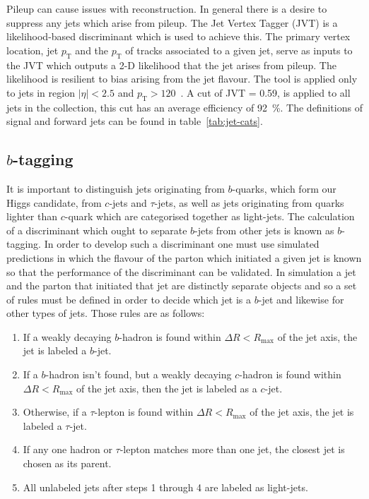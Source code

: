 Pileup can cause issues with reconstruction. In general there is a desire to
suppress any jets which arise from pileup. The Jet Vertex Tagger (JVT) is a
likelihood-based discriminant which is used to achieve this. The primary vertex
location, jet $p_{\mathrm{T}}$ and the $p_{\mathrm{T}}$ of tracks associated to
a given jet, serve as inputs to the JVT which outputs a 2-D likelihood that the
jet arises from pileup. The likelihood is resilient to bias arising from the jet
flavour. The tool is applied only to jets in region $\lvert \eta \rvert < 2.5$
and $p_{\mathrm{T}} > 120$~\GeV. A cut of JVT = 0.59, is applied to all jets in
the collection, this cut has an average efficiency of 92~\%. The definitions of
signal and forward jets can be found in table~\ref{tab:jet-cats}.


\subsection{\texorpdfstring{$b$}{b}-tagging}
\label{sec:btagging}

It is important to distinguish jets originating from $b$-quarks, which form our
Higgs candidate, from $c$-jets and $\tau$-jets, as well as jets originating from
quarks lighter than $c$-quark which are categorised together as light-jets. The
calculation of a discriminant which ought to separate $b$-jets from other jets is
known as $b$-tagging. In order to develop such a discriminant one must use
simulated predictions in which the flavour of the parton which initiated a given
jet is known so that the performance of the discriminant can be validated. In
simulation a jet and the parton that initiated that jet are distinctly separate
objects and so a set of rules must be defined in order to decide which jet is a
$b$-jet and likewise for other types of jets. Those rules are as follows:
\begin{enumerate}
\item  If a weakly decaying $b$-hadron is found within $\Delta R<R_{\text{max}}$ of the
  jet axis, the jet is labeled a $b$-jet.
\item  If a $b$-hadron isn't found, but a weakly decaying $c$-hadron is
  found within $\Delta R<R_{\text{max}}$ of the jet axis, then the jet is labeled as a $c$-jet.
\item  Otherwise, if a $\tau$-lepton is found within
  $\Delta R<R_{\text{max}}$ of the jet axis, the jet is labeled a $\tau$-jet.
\item If any one hadron or $\tau$-lepton matches more than one jet, the closest jet
  is chosen as its parent.
\item All unlabeled jets after steps 1 through 4 are labeled as light-jets.
\end{enumerate}

